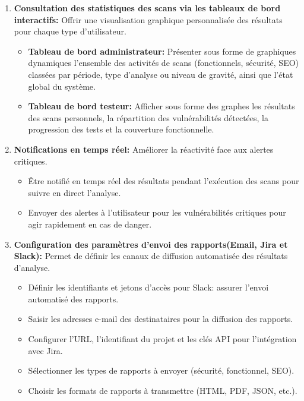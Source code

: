 \begin{justify}
\begin{enumerate}[left=-0.01cm]
        \item \textbf{Consultation des statistiques des scans via les tableaux de bord interactifs:} Offrir une visualisation graphique personnalisée des résultats pour chaque type d’utilisateur.
        \begin{itemize}[label=$\bullet$, left=-0.05cm]
            \item \textbf{Tableau de bord administrateur:} Présenter sous forme de graphiques dynamiques l’ensemble des activités de scans (fonctionnels, sécurité, SEO) classées par période, type d’analyse ou niveau de gravité, ainsi que l’état global du système.
            \item \textbf{Tableau de bord testeur:} Afficher sous forme des graphes les résultats des scans personnels, la répartition des vulnérabilités détectées, la progression des tests et la couverture fonctionnelle.
        \end{itemize}
        \item \textbf{Notifications en temps réel:} Améliorer la réactivité face aux alertes critiques.
            \begin{itemize}[label=$\bullet$, left=-0.05cm]
                \item Être notifié en temps réel des résultats pendant l’exécution des scans pour suivre en direct l’analyse.
                \item Envoyer des alertes à l'utilisateur pour les vulnérabilités critiques pour agir rapidement en cas de danger.
            \end{itemize}
        \item \textbf{Configuration des paramètres d’envoi des rapports(Email, Jira et Slack):} Permet de définir les canaux de diffusion automatisée des résultats d’analyse.
            \begin{itemize}[label=$\bullet$, left=-0.05cm]
                \item Définir les identifiants et jetons d’accès pour Slack: assurer l’envoi automatisé des rapports.
                \item Saisir les adresses e-mail des destinataires pour la diffusion des rapports.
                \item Configurer l’URL, l’identifiant du projet et les clés API pour l’intégration avec Jira.
                \item Sélectionner les types de rapports à envoyer (sécurité, fonctionnel, SEO).
                \item Choisir les formats de rapports à transmettre (HTML, PDF, JSON, etc.).

\end{itemize}
\end{enumerate}
\end{justify}
